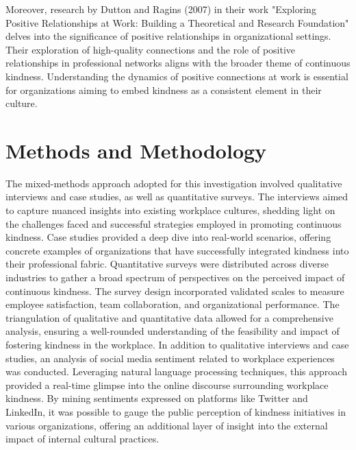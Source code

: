 \documentclass[a4paper, 11pt]{report}
\begin{document}
\vspace{5mm} %
\newline
Moreover, research by Dutton and Ragins (2007) in their work "Exploring Positive Relationships at Work: Building a Theoretical and Research Foundation" delves into the significance of positive relationships in organizational settings. Their exploration of high-quality connections and the role of positive relationships in professional networks aligns with the broader theme of continuous kindness. Understanding the dynamics of positive connections at work is essential for organizations aiming to embed kindness as a consistent element in their culture.


\section{Methods and Methodology}
The mixed-methods approach adopted for this investigation involved qualitative interviews and case studies, as well as quantitative surveys. The interviews aimed to capture nuanced insights into existing workplace cultures, shedding light on the challenges faced and successful strategies employed in promoting continuous kindness. Case studies provided a deep dive into real-world scenarios, offering concrete examples of organizations that have successfully integrated kindness into their professional fabric.
\vspace{5mm} %
\newline
Quantitative surveys were distributed across diverse industries to gather a broad spectrum of perspectives on the perceived impact of continuous kindness. The survey design incorporated validated scales to measure employee satisfaction, team collaboration, and organizational performance. The triangulation of qualitative and quantitative data allowed for a comprehensive analysis, ensuring a well-rounded understanding of the feasibility and impact of fostering kindness in the workplace.
\vspace{5mm} %
\newline
In addition to qualitative interviews and case studies, an analysis of social media sentiment related to workplace experiences was conducted. Leveraging natural language processing techniques, this approach provided a real-time glimpse into the online discourse surrounding workplace kindness. By mining sentiments expressed on platforms like Twitter and LinkedIn, it was possible to gauge the public perception of kindness initiatives in various organizations, offering an additional layer of insight into the external impact of internal cultural practices.
\end{document}
